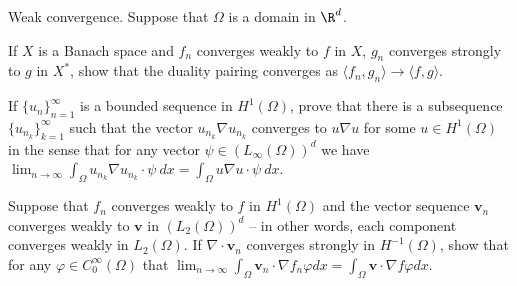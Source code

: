 Weak convergence. Suppose that $\Omega$ is a domain in $\R^d$.
\begin{alist}
\item If $X$ is a Banach space and $f_n$ converges weakly to $f$ in $X$,
$g_n$ converges strongly to $g$ in $X^*$, show that the duality
pairing converges as $\langle f_n,g_n \rangle\rightarrow \langle f,g
\rangle$.
\item If $\{u_n\}_{n=1}^{\infty}$ is a bounded sequence in
$H^1(\Omega)$, prove that there is a subsequence
$\{u_{n_k}\}_{k=1}^{\infty}$ such that the vector $u_{n_k}\nabla
u_{n_k}$ converges to $u\nabla u$ for some $u\in H^1(\Omega)$ in the
sense that for any vector $\psi\in (L_{\infty}(\Omega))^d$ we have
$\lim_{n\rightarrow \infty}\int_{\Omega} u_{n_k}\nabla u_{n_k}\cdot
\psi\ dx=\int_{\Omega}u \nabla u \cdot \psi\ dx$.
\item Suppose that $f_n$ converges weakly to $f$ in $H^1(\Omega)$ and the
vector sequence $\mathbf{v}_n$ converges weakly to $\mathbf{v}$ in
$(L_2(\Omega))^d$ -- in other words, each component converges weakly
in $L_2(\Omega)$. If $\nabla \cdot \mathbf{v}_n$ converges strongly in
$H^{-1}(\Omega)$, show that for any $\varphi\in C^{\infty}_0(\Omega)$
that $\lim_{n\rightarrow \infty}\int_{\Omega}\mathbf{v}_n\cdot \nabla
f_n\varphi dx=\int_{\Omega}\mathbf{v}\cdot \nabla f\varphi dx$.
\end{alist}

